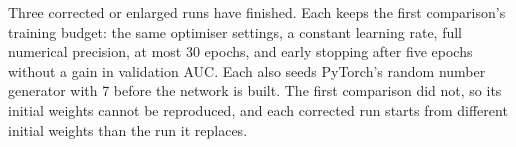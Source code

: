 Three corrected or enlarged runs have finished. Each keeps the first comparison's training budget: the
same optimiser settings, a constant learning rate, full numerical precision, at most 30 epochs, and early
stopping after five epochs without a gain in validation AUC. Each also seeds PyTorch's random number
generator with 7 before the network is built. The first comparison did not, so its initial weights cannot
be reproduced, and each corrected run starts from different initial weights than the run it replaces.

